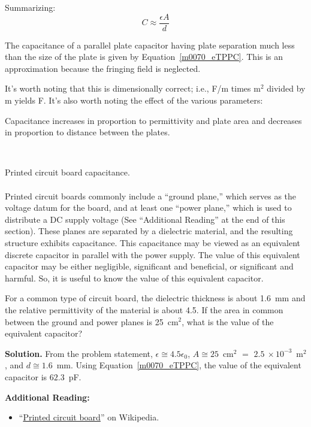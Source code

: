 Summarizing:
%
\begin{equation}
\boxed{
C \approx \frac{\epsilon A}{d}
}
\label{m0070_eTPPC}
\end{equation}
%
\begin{mdframed}[backgroundcolor=yellow!20,nobreak=true] 
The capacitance of a parallel plate capacitor having plate separation much less than the size of the plate is given by Equation~\ref{m0070_eTPPC}.
This is an approximation because the fringing field is neglected. 
\end{mdframed}
%
It's worth noting that this is dimensionally correct; i.e., F/m times m$^2$ divided by m yields F.
It's also worth noting the effect of the various parameters:
%
\begin{mdframed}[backgroundcolor=yellow!20,nobreak=true] 
Capacitance increases in proportion to permittivity and plate area and decreases in proportion to distance between the plates.
\end{mdframed}

~\\ \begin{example} 
\begin{mdframed}[backgroundcolor=brown!20,linecolor=brown!20]\raggedright
Printed circuit board capacitance. 
\\~\\
Printed circuit boards commonly include a ``ground plane,'' 
which serves as the voltage datum for the board, and at least one ``power plane,'' which is used to distribute a DC supply voltage (See ``Additional Reading'' at the end of this section).  These planes are separated by a dielectric material, and the resulting structure exhibits capacitance.  This capacitance may be viewed as an equivalent discrete capacitor in parallel with the power supply. 
The value of this equivalent capacitor may be either negligible, significant and beneficial, or significant and harmful.  So, it is useful to know the value of this equivalent capacitor.   

For a common type of circuit board, the dielectric thickness is about 1.6~mm and the relative permittivity of the material is about 4.5.  If the area in common between the ground and power planes is 25~cm$^2$, what is the value of the equivalent capacitor?

{\bf Solution.}
From the problem statement, 
$\epsilon\cong 4.5\epsilon_0$, 
$A \cong 25$~cm$^2$ $=$ $2.5~\times 10^{-3}$~m$^2$, and
$d \cong 1.6$~mm.
Using Equation~\ref{m0070_eTPPC}, the value of the equivalent capacitor is $62.3$~pF.

\end{mdframed}\end{example}



{\bf Additional Reading:}
\begin{itemize}
\item ``\href{https://en.wikipedia.org/wiki/Printed_circuit_board}{Printed circuit board}'' on Wikipedia.
\end{itemize}

